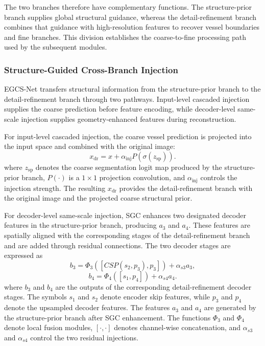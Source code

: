 \documentclass[a4paper,fleqn]{cas-sc}
\begin{document}
The two branches therefore have complementary functions.
The structure-prior branch supplies global structural guidance, whereas the detail-refinement branch combines that guidance with high-resolution features to recover vessel boundaries and fine branches.
This division establishes the coarse-to-fine processing path used by the subsequent modules.

\subsubsection{Structure-Guided Cross-Branch Injection}

EGCS-Net transfers structural information from the structure-prior branch to the detail-refinement branch through two pathways.
Input-level cascaded injection supplies the coarse prediction before feature encoding, while decoder-level same-scale injection supplies geometry-enhanced features during reconstruction.

For input-level cascaded injection, the coarse vessel prediction is projected into the input space and combined with the original image:
\begin{equation}
    x_{\mathrm{dr}} = x + \alpha_{\mathrm{inj}} P(\sigma(z_{\mathrm{sp}})).
    \label{eq:input-cascade}
\end{equation}
where \(z_{\mathrm{sp}}\) denotes the coarse segmentation logit map produced by the structure-prior branch, \(P(\cdot)\) is a \(1 \times 1\) projection convolution, and \(\alpha_{\mathrm{inj}}\) controls the injection strength.
The resulting \(x_{\mathrm{dr}}\) provides the detail-refinement branch with the original image and the projected coarse structural prior.

For decoder-level same-scale injection, SGC enhances two designated decoder features in the structure-prior branch, producing \(a_3\) and \(a_4\).
These features are spatially aligned with the corresponding stages of the detail-refinement branch and are added through residual connections.
The two decoder stages are expressed as
\begin{equation}
    b_3 = \Phi_3([CSP(s_2, p_3), p_3]) + \alpha_{s3} a_3,
    \label{eq:decoder-b3}
\end{equation}
\begin{equation}
    b_4 = \Phi_4([s_1, p_4]) + \alpha_{s4} a_4.
    \label{eq:decoder-b4}
\end{equation}
where \(b_3\) and \(b_4\) are the outputs of the corresponding detail-refinement decoder stages.
The symbols \(s_1\) and \(s_2\) denote encoder skip features, while \(p_3\) and \(p_4\) denote the upsampled decoder features.
The features \(a_3\) and \(a_4\) are generated by the structure-prior branch after SGC enhancement.
The functions \(\Phi_3\) and \(\Phi_4\) denote local fusion modules, \([\cdot,\cdot]\) denotes channel-wise concatenation, and \(\alpha_{s3}\) and \(\alpha_{s4}\) control the two residual injections.
\end{document}
